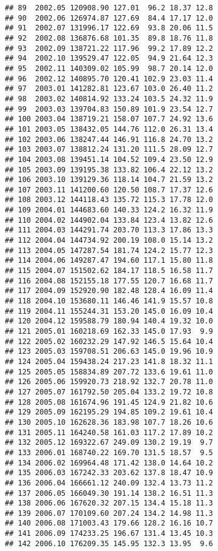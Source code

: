 \documentclass[]{article}
\begin{document}
\begin{verbatim}
## 89  2002.05 120908.90 127.01  96.2 18.37 12.8
## 90  2002.06 126974.87 127.69  84.4 17.17 12.0
## 91  2002.07 131996.17 122.69  93.8 20.06 11.5
## 92  2002.08 136876.68 101.35  89.8 18.76 11.8
## 93  2002.09 138721.22 117.96  99.2 17.89 12.2
## 94  2002.10 139529.47 122.05  94.9 21.64 12.3
## 95  2002.11 140309.02 105.99  98.7 20.14 12.0
## 96  2002.12 140895.70 120.41 102.9 23.03 11.4
## 97  2003.01 141282.81 123.67 103.0 26.40 11.2
## 98  2003.02 140814.92 133.24 103.5 24.32 11.9
## 99  2003.03 139704.83 150.89 101.9 23.54 12.7
## 100 2003.04 138719.21 158.07 107.7 24.92 13.6
## 101 2003.05 138432.05 144.76 112.0 26.31 13.4
## 102 2003.06 138247.44 146.91 116.8 24.70 13.2
## 103 2003.07 138812.24 131.20 111.5 28.09 12.7
## 104 2003.08 139451.14 104.52 109.4 23.50 12.9
## 105 2003.09 139195.38 133.82 106.4 22.12 13.2
## 106 2003.10 139129.36 118.14 104.7 21.59 13.2
## 107 2003.11 141200.60 120.50 108.7 17.37 12.6
## 108 2003.12 144118.43 135.72 115.3 17.78 12.0
## 109 2004.01 144683.60 140.33 124.2 16.32 11.9
## 110 2004.02 144902.04 133.84 123.4 13.82 12.6
## 111 2004.03 144291.74 203.70 113.3 17.86 13.3
## 112 2004.04 144734.92 200.19 108.0 15.14 13.2
## 113 2004.05 147287.54 181.74 124.2 15.77 12.3
## 114 2004.06 149287.47 194.60 117.1 15.80 11.8
## 115 2004.07 151502.62 184.17 118.5 16.58 11.7
## 116 2004.08 152155.18 177.55 120.7 16.68 11.7
## 117 2004.09 152920.90 182.48 128.4 16.09 11.4
## 118 2004.10 153680.11 146.46 141.9 15.57 10.8
## 119 2004.11 155244.31 153.20 145.0 16.09 10.4
## 120 2004.12 159588.79 180.94 140.4 19.32 10.0
## 121 2005.01 160218.69 162.33 145.0 17.93  9.9
## 122 2005.02 160232.29 147.92 146.5 15.64 10.4
## 123 2005.03 159708.51 206.63 145.0 19.96 10.9
## 124 2005.04 159438.24 217.23 141.8 18.32 11.1
## 125 2005.05 158834.89 207.72 133.6 19.61 11.0
## 126 2005.06 159920.73 218.92 132.7 20.78 11.0
## 127 2005.07 161792.50 205.04 133.2 19.72 10.8
## 128 2005.08 161674.96 191.45 124.9 21.82 10.6
## 129 2005.09 162195.29 194.85 109.2 19.61 10.4
## 130 2005.10 162628.36 183.98 107.7 18.26 10.6
## 131 2005.11 164240.58 161.03 117.2 17.89 10.2
## 132 2005.12 169322.67 249.09 130.2 19.19  9.7
## 133 2006.01 168740.22 169.70 131.5 18.57  9.5
## 134 2006.02 169964.48 171.42 138.0 14.64 10.2
## 135 2006.03 167242.33 203.62 137.8 18.47 10.9
## 136 2006.04 166661.12 240.09 132.4 13.73 11.2
## 137 2006.05 166049.30 191.14 138.2 16.51 11.3
## 138 2006.06 167620.32 207.15 134.4 15.18 11.3
## 139 2006.07 170109.60 207.24 134.2 14.98 11.3
## 140 2006.08 171003.43 179.66 128.2 16.16 10.7
## 141 2006.09 174233.25 196.67 131.4 13.45 10.3
## 142 2006.10 176209.35 145.95 132.3 13.95  9.6

\end{verbatim}
\end{document}
